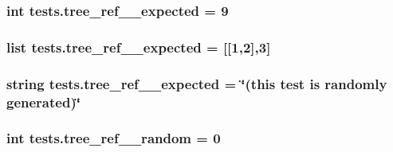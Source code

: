 \subsubsection[{tree\+\_\+ref\+\_\+1\+\_\+expected}]{\setlength{\rightskip}{0pt plus 5cm}int tests.\+tree\+\_\+ref\+\_\+\_\+expected = 9}\label{namespacetests_ab4e82067e2778125c60ee17784126f1b}
\hypertarget{namespacetests_a0909c7dfe851ffd4417287e08b3ef0bd}{}
\subsubsection[{tree\+\_\+ref\+\_\+2\+\_\+expected}]{\setlength{\rightskip}{0pt plus 5cm}list tests.\+tree\+\_\+ref\+\_\+\_\+expected = \mbox{[}\mbox{[}1,2\mbox{]},3\mbox{]}}\label{namespacetests_a0909c7dfe851ffd4417287e08b3ef0bd}
\hypertarget{namespacetests_af16279d713a3630d67f4cfa0d442e2f9}{}
\subsubsection[{tree\+\_\+ref\+\_\+3\+\_\+expected}]{\setlength{\rightskip}{0pt plus 5cm}string tests.\+tree\+\_\+ref\+\_\+\_\+expected = \char`\"{}(this test is randomly generated)\char`\"{}}\label{namespacetests_af16279d713a3630d67f4cfa0d442e2f9}
\hypertarget{namespacetests_a5525abd2a0e34f4c6481fcaabd7b0ce8}{}
\subsubsection[{tree\+\_\+ref\+\_\+3\+\_\+random}]{\setlength{\rightskip}{0pt plus 5cm}int tests.\+tree\+\_\+ref\+\_\+\_\+random = 0}\label{namespacetests_a5525abd2a0e34f4c6481fcaabd7b0ce8}
\hypertarget{namespacetests_af14077e20d51a6f1129ccf4dc8b4db3f}{}
